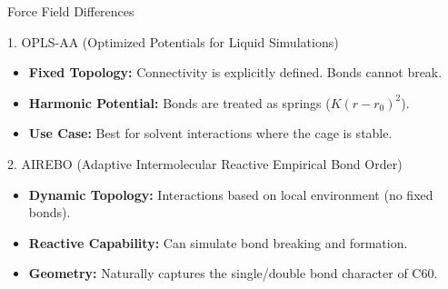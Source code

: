 \documentclass[aspectratio=169, 10pt]{beamer}
\begin{document}
\begin{frame}{Force Field Differences}

    \begin{block}{1. OPLS-AA (Optimized Potentials for Liquid Simulations)}
        \begin{itemize}
            \item \textbf{Fixed Topology:} Connectivity is explicitly defined. Bonds cannot break.
            \item \textbf{Harmonic Potential:} Bonds are treated as springs ($K(r-r_0)^2$).
            \item \textbf{Use Case:} Best for solvent interactions where the cage is stable.
        \end{itemize}
    \end{block}

    \vspace{0.5cm}

    \begin{block}{2. AIREBO (Adaptive Intermolecular Reactive Empirical Bond Order)}
        \begin{itemize}
            \item \textbf{Dynamic Topology:} Interactions based on local environment (no fixed bonds).
            \item \textbf{Reactive Capability:} Can simulate bond breaking and formation.
            \item \textbf{Geometry:} Naturally captures the single/double bond character of C60.
        \end{itemize}
    \end{block}

\end{frame}
\end{document}
